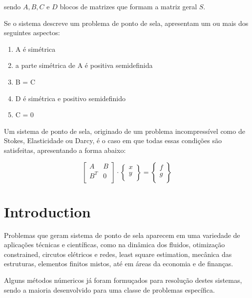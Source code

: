 \documentclass[12pt]{article}
\begin{document}
sendo \(A, B, C\) e \(D\) blocos de matrizes que formam a matriz geral \(S\).

Se o sistema descreve um problema de ponto de sela, apresentam um ou mais dos seguintes aspectos: 

\begin{enumerate}
  \item A é simétrica
  \item a parte simétrica de A é positiva semidefinida
  \item B = C 
  \item D é simétrica e positivo semidefinido
  \item C = 0 
\end{enumerate}

Um sistema de ponto de sela, originado de um problema incompressível como de Stokes, Elasticidade ou Darcy, é o caso em que todas 
essas condições são satisfeitas, apresentando a forma abaixo:

\begin{equation} \label{eq:system}
    \begin{bmatrix}
        A & B \\
        B^T & 0 \\
    \end{bmatrix}
    \cdot
    \begin{Bmatrix}
        x \\
        y \\
    \end{Bmatrix}
    =
    \begin{Bmatrix}
        f \\
        g \\
    \end{Bmatrix}
\end{equation}

\section{Introduction}

Problemas que geram sistema de ponto de sela aparecem em uma variedade de aplicações técnicas e científicas, como na dinâmica dos fluidos, 
otimização constrained, circutos elétricos e redes, least square estimation, mecânica das estruturas, elementos finitos mistos, até em áreas 
da economia e de finanças.

Alguns métodos númericos já foram  formuçados para resolução destes sistemas, sendo a maioria desenvolvido para uma classe de problemas 
específica. 
 
\end{document}
